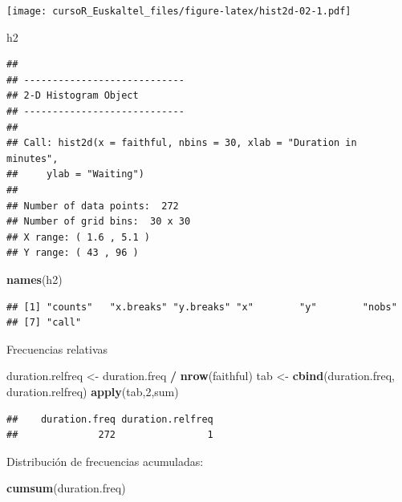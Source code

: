 \documentclass[]{book}
\newenvironment{Shaded}{\begin{snugshade}}{\end{snugshade}}
\newcommand{\KeywordTok}[1]{\textcolor[rgb]{0.13,0.29,0.53}{\textbf{#1}}}
\newcommand{\DecValTok}[1]{\textcolor[rgb]{0.00,0.00,0.81}{#1}}
\newcommand{\StringTok}[1]{\textcolor[rgb]{0.31,0.60,0.02}{#1}}
\newcommand{\OperatorTok}[1]{\textcolor[rgb]{0.81,0.36,0.00}{\textbf{#1}}}
\newcommand{\NormalTok}[1]{#1}
\begin{document}
\texttt{[image: cursoR\_Euskaltel\_files/figure-latex/hist2d-02-1.pdf]}

\begin{Shaded}
\begin{Highlighting}[]
\NormalTok{h2}
\end{Highlighting}
\end{Shaded}

\begin{verbatim}
## 
## ----------------------------
## 2-D Histogram Object
## ----------------------------
## 
## Call: hist2d(x = faithful, nbins = 30, xlab = "Duration in minutes", 
##     ylab = "Waiting")
## 
## Number of data points:  272 
## Number of grid bins:  30 x 30 
## X range: ( 1.6 , 5.1 )
## Y range: ( 43 , 96 )
\end{verbatim}

\begin{Shaded}
\begin{Highlighting}[]
\KeywordTok{names}\NormalTok{(h2)}
\end{Highlighting}
\end{Shaded}

\begin{verbatim}
## [1] "counts"   "x.breaks" "y.breaks" "x"        "y"        "nobs"    
## [7] "call"
\end{verbatim}

Frecuencias relativas

\begin{Shaded}
\begin{Highlighting}[]
\NormalTok{duration.relfreq <-}\StringTok{ }\NormalTok{duration.freq }\OperatorTok{/}\StringTok{ }\KeywordTok{nrow}\NormalTok{(faithful) }
\NormalTok{tab <-}\StringTok{ }\KeywordTok{cbind}\NormalTok{(duration.freq, duration.relfreq) }
\KeywordTok{apply}\NormalTok{(tab,}\DecValTok{2}\NormalTok{,sum)}
\end{Highlighting}
\end{Shaded}

\begin{verbatim}
##    duration.freq duration.relfreq 
##              272                1
\end{verbatim}

Distribución de frecuencias acumuladas:

\begin{Shaded}
\begin{Highlighting}[]
\KeywordTok{cumsum}\NormalTok{(duration.freq)}
\end{Highlighting}
\end{Shaded}
\end{document}
